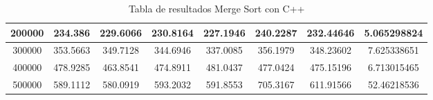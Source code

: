 \documentclass{article}
\begin{document}
\begin{table}[]
\begin{tabular}{|c|c|c|c|c|c|c|c| }
                200000	&234.386	    & 229.6066	&230.8164	&227.1946	&240.2287	&232.44646	&5.065298824\\ \hline
                300000	&353.5663	&349.7128	&344.6946	&337.0085	&356.1979	&348.23602	&7.625338651\\ \hline
                400000	&478.9285	&463.8541	&474.8911	&481.0437	&477.0424	&475.15196	&6.713015465\\ \hline
                500000	&589.1112	&580.0919	&593.2032	&591.8553	&705.3167	&611.91566	&52.46218536\\ \hline
        \end{tabular}
        \caption{Tabla de resultados Merge Sort con C++}
        \label{tab:mergeSortC}
    \end{table}
\end{document}
